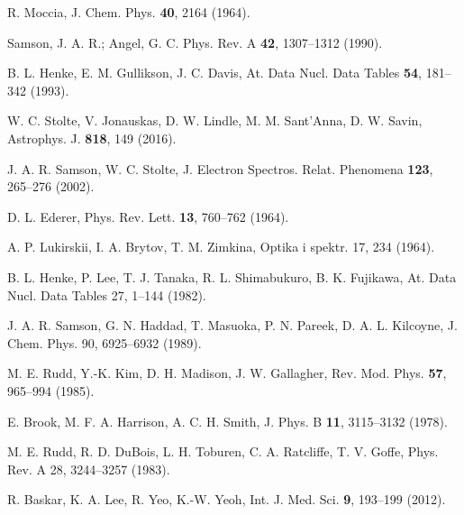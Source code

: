 \begin{thebibliography}{9}
R. Moccia, 
J. Chem. Phys. \textbf{40}, 2164 (1964).


Samson, J. A. R.; Angel, G. C.
Phys. Rev. A \textbf{42}, 1307--1312 (1990).

B. L. Henke, E. M. Gullikson, J. C. Davis, 
At. Data Nucl. Data Tables \textbf{54}, 181--342 (1993).

W. C. Stolte, V. Jonauskas, D. W. Lindle, M. M. Sant'Anna, D. W. Savin, 
Astrophys. J. \textbf{818}, 149 (2016).

J. A. R. Samson, W. C. Stolte, 
J. Electron Spectros. Relat. Phenomena \textbf{123}, 265--276 (2002).

D. L. Ederer, 
Phys. Rev. Lett. \textbf{13}, 760--762 (1964).

A. P. Lukirskii, I. A. Brytov, T. M. Zimkina, 
Optika i spektr. 17, 234 (1964).

B. L. Henke, P. Lee, T. J. Tanaka, R. L. Shimabukuro, B. K. Fujikawa, 
At. Data Nucl. Data Tables 27, 1--144 (1982).

J. A. R. Samson, G. N. Haddad, T. Masuoka, P. N. Pareek, D. A. L. Kilcoyne, 
J. Chem. Phys. 90, 6925--6932 (1989).


M. E. Rudd, Y.-K. Kim, D. H. Madison, J. W. Gallagher, 
Rev. Mod. Phys. \textbf{57}, 965--994 (1985).

E. Brook, M. F. A. Harrison, A. C. H. Smith, 
J. Phys. B \textbf{11}, 3115--3132 (1978).

M. E. Rudd, R. D. DuBois, L. H. Toburen, C. A. Ratcliffe, T. V. Goffe, 
Phys. Rev. A 28, 3244--3257 (1983).



R. Baskar, K. A. Lee, R. Yeo, K.-W. Yeoh,
Int. J. Med. Sci. \textbf{9}, 193--199 (2012).


\end{thebibliography}
